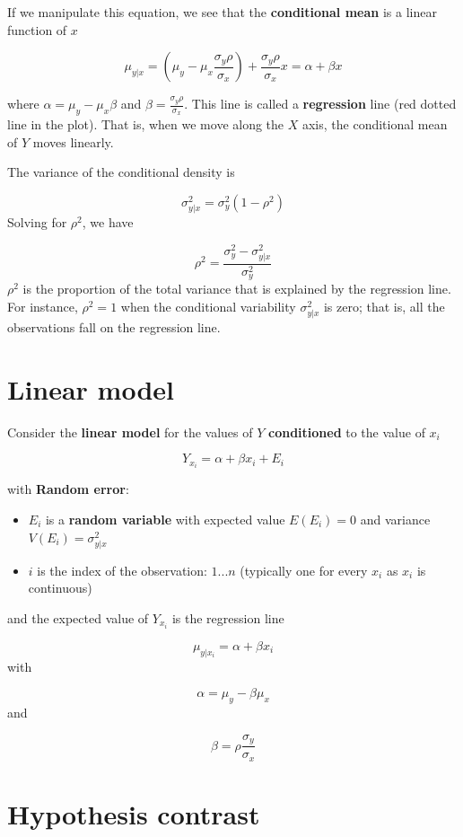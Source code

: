 \documentclass[
]{book}
\begin{document}
If we manipulate this equation, we see that the \textbf{conditional mean} is a linear function of \(x\)

\[\mu_{y|x}=(\mu_y-\mu_x \frac{\sigma_y\rho}{\sigma_x})+\frac{\sigma_y \rho}{\sigma_x} x=\alpha + \beta x\]

where \(\alpha=\mu_y-\mu_x \beta\) and \(\beta=\frac{\sigma_y \rho}{\sigma_x}\). This line is called a \textbf{regression} line (red dotted line in the plot). That is, when we move along the \(X\) axis, the conditional mean of \(Y\) moves linearly.

The variance of the conditional density is

\[\sigma^2_{y|x}= \sigma_y^2(1-\rho^2)\]
Solving for \(\rho^2\), we have

\[\rho^2=\frac{\sigma_y^2-\sigma^2_{y|x}}{\sigma_y^2} \]
\(\rho^2\) is the proportion of the total variance that is explained by the regression line. For instance, \(\rho^2=1\) when the conditional variability \(\sigma^2_{y|x}\) is zero; that is, all the observations fall on the regression line.

\hypertarget{linear-model-3}{%
\section{Linear model}\label{linear-model-3}}

Consider the \textbf{linear model} for the values of \(Y\) \textbf{conditioned} to the value of \(x_i\)

\[Y_{x_i} = \alpha + \beta x_i +E_{i}\]

with \textbf{Random error}:

\begin{itemize}
\item
  \(E_{i}\) is a \textbf{random variable} with expected value \(E(E_{i})=0\) and variance \(V(E_{i})=\sigma_{y|x}^2\)
\item
  \(i\) is the index of the observation: \(1...n\) (typically one for every \(x_i\) as \(x_i\) is continuous)
\end{itemize}

and the expected value of \(Y_{x_i}\) is the regression line

\[\mu_{y|x_i}=\alpha + \beta x_i\]
with

\[\alpha=\mu_y-\beta\mu_x\]
and

\[\beta=\rho\frac{\sigma_y}{\sigma_x}\]

\hypertarget{hypothesis-contrast-1}{%
\section{Hypothesis contrast}\label{hypothesis-contrast-1}}
\end{document}
